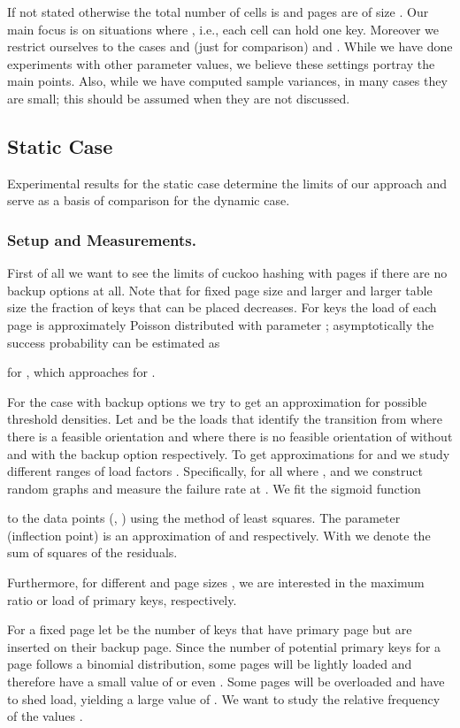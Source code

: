 \let\accentvec\vec \documentclass{llncs}
\newcommand{\ie}{i.e.}
\begin{document}
If not stated otherwise the total number of cells is  and pages are of size . Our main focus is on situations where , \ie, each cell can hold one key. Moreover we restrict ourselves to the cases  and (just for comparison)  and .  While we have done experiments with other parameter values, we believe these settings portray the main points.  Also, while we have computed sample variances, in many cases they are small;  this should be assumed when they are not discussed.  

\subsection{Static Case}
Experimental results for the static case determine the limits of our approach and serve as a basis of comparison for the dynamic case.
\subsubsection{Setup and Measurements.}
First of all we want to see the limits of cuckoo hashing with pages if there are no backup options at all.
Note that for fixed page size  and larger and larger table size  the fraction of keys that can be placed decreases.
For  keys the load of each page is approximately Poisson distributed with parameter ; 
asymptotically the success probability
can be estimated as

for , which approaches  for .

For the case with backup options we try to get an approximation for possible threshold densities.
Let  and  be the loads  that identify the transition from where there is a feasible orientation and where there is no feasible orientation of  without and with the backup option respectively.
To get approximations for  and  we study different ranges of load factors .
Specifically, for all  where , and   we construct  random graphs 
and measure the failure rate  at . We fit the sigmoid function 

to the data points (, ) using the method of least squares. The parameter  (inflection point) is an approximation of  and  respectively. With  we denote the sum of squares of the residuals.

Furthermore, for different  and page sizes , we are interested in the maximum ratio  or load  of primary keys, respectively.

For a fixed page  let  be the number of keys that have primary page  but are inserted on their backup page.
Since the number of potential primary keys for a page follows a binomial distribution, 
some pages will be lightly loaded and therefore have a small value of  or even .
Some pages will be overloaded and have to shed load, yielding a large value of .
We want to study the relative frequency of the values .
\end{document}
